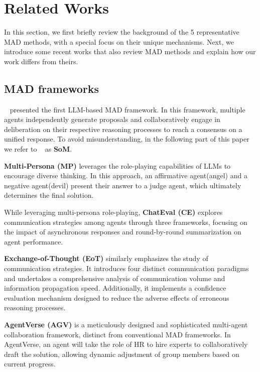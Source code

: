 \section{Related Works}
In this section, we first briefly review the background of the 5 representative MAD methods, with a special focus on their unique mechanisms. Next, we introduce some recent works that also review MAD methods and explain how our work differs from theirs.

\subsection{MAD frameworks}

~\citet{duimproving} presented the first LLM-based MAD framework. In this framework, multiple agents independently generate proposals and collaboratively engage in deliberation on their respective reasoning processes to reach a consensus on a unified response. To avoid misunderstanding, in the following part of this paper we refer to ~\citet{duimproving} as \textbf{SoM}.

\textbf{Multi-Persona (MP)} \cite{liang2023encouraging} leverages the role-playing capabilities of LLMs to encourage diverse thinking. In this approach, an affirmative agent(angel) and a negative agent(devil) present their answer to a judge agent, which ultimately determines the final solution.

While leveraging multi-persona role-playing, \textbf{ChatEval (CE)} \cite{chanchateval} explores communication strategies among agents through three frameworks, focusing on the impact of asynchronous responses and round-by-round summarization on agent performance.


\textbf{Exchange-of-Thought (EoT)} \cite{yin2023exchange} similarly emphasizes the study of communication strategies. It introduces four distinct communication paradigms and undertakes a comprehensive analysis of communication volume and information propagation speed. Additionally, it implements a confidence evaluation mechanism designed to reduce the adverse effects of erroneous reasoning processes.


\textbf{AgentVerse (AGV)} \cite{chen2023agentverse} is a meticulously designed and sophisticated multi-agent collaboration framework, distinct from conventional MAD frameworks. In AgentVerse, an agent will take the role of HR to hire experts to collaboratively draft the solution, allowing dynamic adjustment of group members based on current progress.

